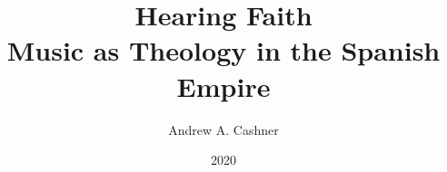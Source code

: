\documentclass{tex/vcbook}
\title{Hearing Faith\\
Music as Theology in the Spanish Empire}
\author{Andrew A. Cashner}
\date{2020}
\begin{document}
\maketitle

\frontmatter
\tableofcontents* \clearpage
\listoffigures
\listofdiagrams
\listoftables
\listofpoemexamples
\listofmusicexamples

\mainmatter







\backmatter


\end{document}
